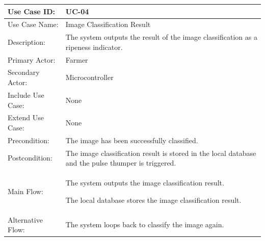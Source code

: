 \begin{thesisprose}
\FloatBarrier
\begingroup
\small
\setlength{\tabcolsep}{3pt}
\renewcommand{\arraystretch}{1.14}
\setlength{\arrayrulewidth}{0.625pt}
\def\LTcaptype{uncaptionedgrid}
\begin{longtable}{|>{\raggedright\arraybackslash}p{}|>{\raggedright\arraybackslash}p{}|}
\hline
Use Case ID: & UC-04 \\
\hline
Use Case Name: & Image Classification Result \\
\hline
Description: & The system outputs the result of the image classification as a ripeness indicator. \\
\hline
Primary Actor: & Farmer \\
\hline
Secondary Actor: & Microcontroller \\
\hline
Include Use Case: & None \\
\hline
Extend Use Case: & None \\
\hline
Precondition: & The image has been successfully classified. \\
\hline
Postcondition: & The image classification result is stored in the local database and the pulse thumper is triggered. \\
\hline
Main Flow: & The system outputs the image classification result.\par The local database stores the image classification result. \\
\hline
Alternative Flow: & The system loops back to classify the image again. \\
\hline
\end{longtable}
\endgroup


\end{thesisprose}
